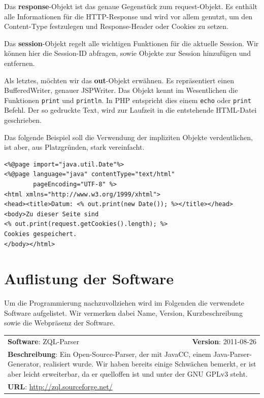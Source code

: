 Das \textbf{response}-Objekt ist das genaue Gegenstück zum request-Objekt. Es enthält alle Informationen für die HTTP-Response und wird vor allem genutzt, um den Content-Type festzulegen und Response-Header oder Cookies zu setzen. 

Das \textbf{session}-Objekt regelt alle wichtigen Funktionen für die aktuelle Session. Wir können hier die Session-ID abfragen, sowie Objekte zur Session hinzufügen und entfernen.

Als letztes, möchten wir das \textbf{out}-Objekt erwähnen. Es repräsentiert einen BufferedWriter, genauer JSPWriter. Das Objekt kennt im Wesentlichen die Funktionen \verb|print| und \verb|println|. In PHP entspricht dies einem \verb|echo| oder \verb|print| Befehl. Der so gedruckte Text, wird zur Laufzeit in die entstehende HTML-Datei geschrieben. 

Das folgende Beispiel soll die Verwendung der impliziten Objekte verdeutlichen, ist aber, aus Platzgründen, stark vereinfacht.
\lstset{language=Java}
\begin{lstlisting}
<%@page import="java.util.Date"%>
<%@page language="java" contentType="text/html" 
		pageEncoding="UTF-8" %>
<html xmlns="http://www.w3.org/1999/xhtml">
<head><title>Datum: <% out.print(new Date()); %></title></head>
<body>Zu dieser Seite sind 
<% out.print(request.getCookies().length); %> 
Cookies gespeichert.
</body></html>
\end{lstlisting}

\section{Auflistung der Software}

Um die Programmierung nachzuvollziehen wird im Folgenden die verwendete Software aufgelistet. Wir vermerken dabei Name, Version, Kurzbeschreibung sowie die Webpräsenz der Software.

\begin{tabular}{p{10cm}r}
\textbf{Software}: ZQL-Parser & \textbf{Version}: 2011-08-26\\
\multicolumn{2}{p{1\textwidth}}{\textbf{Beschreibung}: Ein Open-Source-Parser, der mit JavaCC, einem Java-Parser-Generator, realisiert wurde. Wir haben bereits einige Schwächen bemerkt, er ist aber leicht erweiterbar, da er quelloffen ist und unter der GNU GPLv3 steht.}\\
\multicolumn{2}{l}{\textbf{URL}: \url{http://zql.sourceforge.net/}}
\end{tabular}\\

